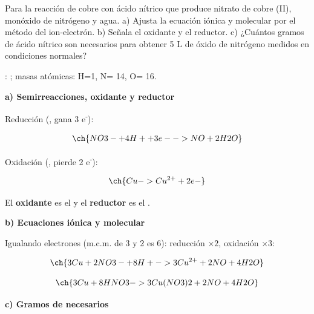 \begin{exerciseEVAU}
    Para la reacción de cobre con ácido nítrico que produce nitrato de cobre (II), monóxido de nitrógeno y agua. a) Ajusta la ecuación iónica y molecular por el método del ion-electrón. b) Señala el oxidante y el reductor. c) ¿Cuántos gramos de ácido nítrico son necesarios para obtener 5 L de óxido de nitrógeno medidos en condiciones normales?

    \datos{}: \ctegases; masas atómicas: H=1, N= 14, O= 16.

    \begin{solu}


        \textbf{a) Semirreacciones, oxidante y reductor}

        Reducción (, gana 3 e\textsuperscript{-}):

        \begin{equation*}
            \ch{NO3- + 4 H+ + 3 e- -> NO + 2 H2O}
        \end{equation*}

        Oxidación (, pierde 2 e\textsuperscript{-}):

        \begin{equation*}
            \ch{Cu -> Cu^{2+} + 2 e-}
        \end{equation*}

        El \textbf{oxidante} es el  y el \textbf{reductor} es el .

        \textbf{b) Ecuaciones iónica y molecular}

        Igualando electrones (m.c.m. de 3 y 2 es 6): reducción \(\times 2\), oxidación \(\times 3\):

        \begin{equation*}
            \ch{3 Cu + 2 NO3- + 8 H+ -> 3 Cu^{2+} + 2 NO + 4 H2O}
        \end{equation*}

        \begin{equation*}
            \ch{3 Cu + 8 HNO3 -> 3 Cu(NO3)2 + 2 NO + 4 H2O}
        \end{equation*}

        \textbf{c) Gramos de  necesarios}


\end{solu}
\end{exerciseEVAU}
